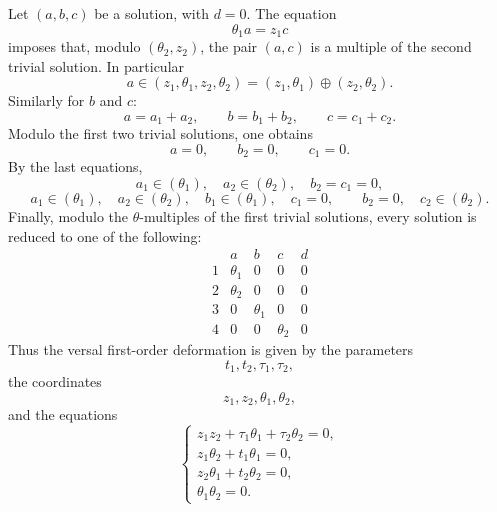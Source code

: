 \documentclass[11pt]{article}
\begin{document}
Let $(a,b,c)$ be a solution, with $d=0$. The equation
\[
  \theta_1 a=z_1c
\]
imposes that, modulo $(\theta_2,z_2)$, the pair $(a,c)$ is a multiple of the second trivial solution. In particular
\[
  a\in (z_1,\theta_1,z_2,\theta_2)=(z_1,\theta_1)\oplus(z_2,\theta_2).
\]
Similarly for $b$ and $c$:
\[
  a=a_1+a_2,
  \qquad b=b_1+b_2,
  \qquad c=c_1+c_2.
\]
Modulo the first two trivial solutions, one obtains
\[
  a=0,\qquad b_2=0,\qquad c_1=0.
\]
By the last equations,
\[
  a_1\in(\theta_1),\quad a_2\in(\theta_2),\quad b_2=c_1=0,
\]
\[
  a_1\in(\theta_1),\quad a_2\in(\theta_2),\quad b_1\in(\theta_1),\quad c_1=0,
  \qquad b_2=0,\quad c_2\in(\theta_2).
\]
Finally, modulo the $\theta$-multiples of the first trivial solutions, every solution is reduced to one of the following:
\[
\begin{array}{c|cccc}
& a&b&c&d\\ \hline
1&\theta_1&0&0&0\\
2&\theta_2&0&0&0\\
3&0&\theta_1&0&0\\
4&0&0&\theta_2&0
\end{array}
\]
Thus the versal first-order deformation is given by the parameters
\[
  t_1,t_2,\tau_1,\tau_2,
\]
the coordinates
\[
  z_1,z_2,\theta_1,\theta_2,
\]
and the equations
\[
\begin{cases}
 z_1z_2+\tau_1\theta_1+\tau_2\theta_2=0,\\
 z_1\theta_2+t_1\theta_1=0,\\
 z_2\theta_1+t_2\theta_2=0,\\
 \theta_1\theta_2=0.
\end{cases}
\]
\end{document}
